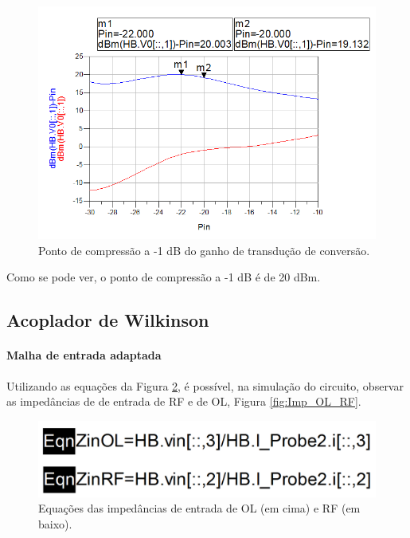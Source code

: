 \documentclass[11pt]{article}
\numberwithin{equation}{section}
\begin{document}
\begin{figure}[h]
\centering
\includegraphics[keepaspectratio=true, scale=0.45]{exps/Compression}
\vspace{-0.5em}
\caption{Ponto de compressão a -1 dB do ganho de transdução de conversão.}
\vspace{-0.8em}
\label{fig:Compressao}
\end{figure}

Como se pode ver, o  ponto de compressão a -1 dB é de 20 dBm.

\subsection{Acoplador de Wilkinson}

\paragraph{Malha de entrada adaptada} \hspace{0pt} 

Utilizando as equações da Figura \ref{fig:Eq}, é possível, na simulação do circuito, observar as impedâncias de de entrada de RF e de OL, Figura \ref{fig:Imp_OL_RF}.

\begin{figure}[h]
\centering
\includegraphics[keepaspectratio=true, scale=0.33]{exps/Eq}
\vspace{-0.5em}
\caption{Equações das impedâncias de entrada de OL (em cima) e RF (em baixo).}
\vspace{-0.8em}
\label{fig:Eq}
\end{figure}
\end{document}
